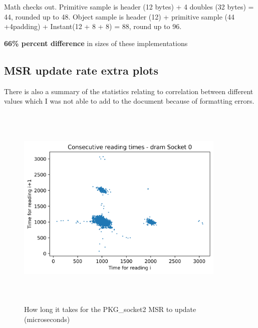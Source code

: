 Math checks out. Primitive sample is header (12 bytes) + 4 doubles (32 bytes) =
44, rounded up to 48.
Object sample is header (12) + primitive sample (44 +4padding) + Instant(12 + 8 + 8) = 88, round up to 96.

\textbf{66\% percent difference} in sizes of these implementations

\subsection{MSR update rate extra plots}



There is also a summary of the statistics relating to correlation between different values which I was not able to add to the document because of formatting errors. %

\begin{figure}[H]
    \centering
    \includegraphics[width=10cm,height=10cm,keepaspectratio]{jmh/msr-update-rate/dram_Socket_0-i_n-v-i_n1.png}
    \caption{How long it takes for the PKG\_socket2 MSR to update (microseconds)}
    \label{fig:PKG-rapl-counter}
\end{figure}

